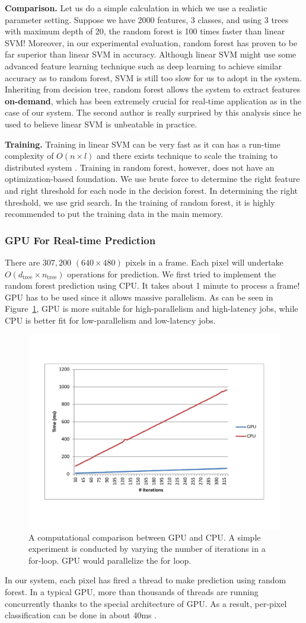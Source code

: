 \textbf{Comparison.} Let us do a simple calculation in which we use a realistic parameter setting. Suppose we have 2000 features, 3 classes, and using 3 trees with maximum depth of 20, the random forest is 100 times faster than linear SVM! Moreover, in our experimental evaluation, random forest has proven to be far superior than linear SVM in accuracy. Although linear SVM might use some advanced feature learning technique such as deep learning to achieve similar accuracy as to random forest, SVM is still too slow for us to adopt in the system. Inheriting from decision tree, random forest allows the system to extract features \textbf{on-demand}, which has been extremely crucial for real-time application as in the case of our system. The second author  is really surprised by this analysis since he used to believe linear SVM is unbeatable in practice.




\textbf{Training.} Training in linear SVM can be very fast as it can has a run-time complexity of $O(n\times l)$ and there exists technique to scale the training to distributed system . Training in random forest, however, does not have an optimization-based foundation. We use brute force to determine the right feature and right threshold for each node in the decision forest. In determining the right threshold, we use grid search. In the training of random forest, it is highly recommended to put the training data in the main memory.


\subsubsection{GPU For Real-time Prediction}
There are $307,200$ $(640\times 480)$ pixels in a frame. Each pixel will undertake $O(d_{\text{tree}}\times n_{\text{tree}})$ operations for prediction. We first tried to implement the random forest prediction using CPU. It takes about 1 minute to process a frame! GPU has to be used since it allows massive parallelism. As can be seen in Figure~\ref{fig: GPUvsCPU}, GPU is more suitable for high-parallelism and high-latency jobs, while CPU is better fit for low-parallelism and low-latency jobs.

\begin{figure}
	\includegraphics[width=0.45 \textwidth]{fig/GPUvsCPU.pdf}
    \caption{A computational comparison between GPU and CPU. A simple experiment is conducted by varying the number of iterations in a for-loop. GPU would parallelize the for loop.}
    \label{fig: GPUvsCPU}
\end{figure}

In our system, each pixel has fired a thread to make prediction using random forest. In a typical GPU, more than thousands of threads are running concurrently thanks to the special architecture of GPU. As a result, per-pixel classification can be done in about 40ms .
